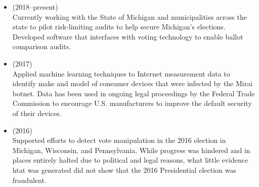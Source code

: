 \documentclass[11pt]{article}
\begin{document}
{%

\vspace{-6pt}


\begin{itemize}[label={--\ },leftmargin=0.25in,labelsep=0.1625em]
\addtolength{\itemsep}{-0.25\baselineskip}

\item{} (2018--present)\\
{\small Currently working with the State of Michigan and municipalities across the state to pilot risk-limiting audits to help secure Michigan's elections. Developed software that interfaces with voting technology to enable ballot comparison audits.}

\item{} (2017)\\
{\small Applied machine learning techniques to Internet measurement data to identify make and model of consumer devices that were infected by the Mirai botnet. Data has been used in ongoing legal proceedings by the Federal Trade Commission to encourage U.S. manufacturers to improve the default security of their devices.}
\item{} (2016)\\
{\small Supported efforts to detect vote manipulation in the 2016 election in Michigan, Wisconsin, and Pennsylvania. While progress was hindered and in places entirely halted due to political and legal reasons, what little evidence htat was generated did not show that the 2016 Presidential election was fraudulent.}
\end{itemize}

}
\end{document}
